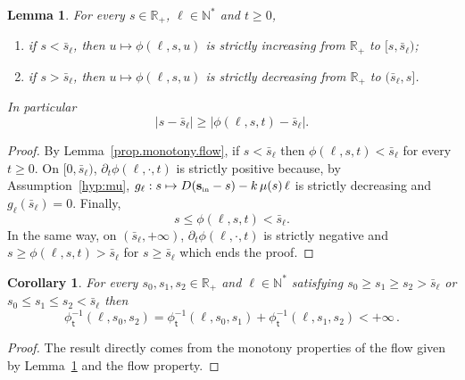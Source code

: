 \documentclass[10pt]{amsart}
\newtheorem{lemm}[theo]{Lemma}\newtheorem{prop}[theo]{Proposition}\newtheorem{coro}[theo]{Corollary}\newtheorem{conj}[theo]{Conjecture}
\theoremstyle{definition}\newtheorem{defi}[theo]{Definition}\newtheorem{rema}[theo]{Remark}\newtheorem{exam}[theo]{Example}\newtheorem{exem}[theo]{Example}\newtheorem{nota}[theo]{Notation}
\newcommand{\RR}{\mathbb{R}}
\newcommand{\NN}{\mathbb{N}}
\newcommand{\Sin}{{\mathbf s}_{\textrm{\tiny\rm in}}}
\newcommand{\phit}{\phi_\textsf{t}^{-1}}
\newcommand{\1}{\mathbf{1}}
\begin{document}
\begin{lemm}\label{lem:rapprochement}
For every $s \in \RR_+$, $\ell \in \NN^*$ and $t\geq 0$,
\begin{enumerate}
\item\label{lemmA.3.1} if $s< \bar s_\ell$, then $u\mapsto \phi(\ell,s,u)$ is strictly increasing from $\RR_+$ to $[s,\bar s_\ell)$;
\item\label{lemmA.3.2} if $s> \bar s_\ell$, then $u\mapsto \phi(\ell,s,u)$ is strictly decreasing from $\RR_+$ to $(\bar s_\ell,s]$.
\end{enumerate}
In particular
\[
|s - \bar s_\ell| \geq \left|\phi(\ell,s,t) - \bar s_\ell \right|.
\]
\end{lemm}
\begin{proof}
By Lemma~\ref{prop.monotony.flow}, if $s< \bar s_\ell$ then $\phi(\ell,s,t) < \bar s_\ell$ for every $t\geq 0$. On $[0, \bar s_\ell)$, $\partial_t \phi(\ell,\cdot,t)$ is strictly positive because, by Assumption~\ref{hyp:mu}, $g_\ell:s\mapsto D(\Sin-s)-k\,\mu(s)\,\ell$ is strictly decreasing and $g_\ell(\bar s_\ell)=0$. Finally,
\[
s \leq \phi(\ell,s,t) < \bar s_\ell.
\]
In the same way, on $(\bar s_\ell,+\infty)$, $\partial_t \phi(\ell,\cdot,t)$ is strictly negative and $s \geq \phi(\ell,s,t) > \bar s_\ell$ for $s\geq \bar s_\ell$ which ends the proof.
\end{proof}


\begin{coro}\label{cor:monotonyphit}
For every $s_0,s_1,s_2 \in \RR_+$ and $\ell \in \NN^*$ satisfying $s_0 \geq s_1 \geq s_2 > \bar s_\ell$ or $s_0 \leq s_1 \leq s_2 < \bar s_\ell$ then
\[
\phit(\ell,s_0,s_2) = \phit(\ell,s_0,s_1)+\phit(\ell,s_1,s_2)<+\infty \,.
\]
\end{coro}
\begin{proof}
The result directly comes from the monotony properties of the flow given by Lemma~\ref{lem:rapprochement} and the flow property.
\end{proof}
\end{document}
